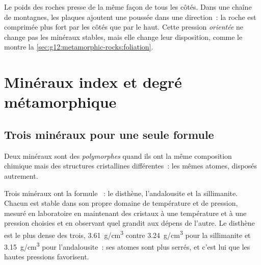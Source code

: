 Le poids des roches presse de la même façon de tous les côtés. Dans une
chaîne de montagnes, les plaques ajoutent une poussée dans une direction~:
la roche est comprimée plus fort par les côtés que par le haut. Cette
pression \emph{orientée} ne change pas les minéraux stables, mais elle
change leur disposition, comme le montre la
\cref{sec:g12:metamorphic-rocks:foliation}.

\section{Minéraux index et degré métamorphique}

\subsection{Trois minéraux pour une seule formule}

\begin{definition}[Polymorphe]\label{def:g12:metamorphic-rocks:polymorph}
Deux minéraux sont des \emph{polymorphes} quand ils ont la
même composition chimique mais des structures cristallines différentes~:
les mêmes atomes, disposés autrement.
\end{definition}

Trois minéraux ont la formule ~: le disthène, l'andalousite et
la sillimanite. Chacun est stable dans son propre domaine de température et
de pression, mesuré en laboratoire en maintenant des cristaux à une
température et à une pression choisies et en observant quel 
grandit aux dépens de l'autre. Le disthène est le plus dense des trois,
\qty{3.61}{g/cm^3} contre \qty{3.24}{g/cm^3} pour la sillimanite et
\qty{3.15}{g/cm^3} pour l'andalousite~: ses atomes sont plus serrés, et
c'est lui que les hautes pressions favorisent.

